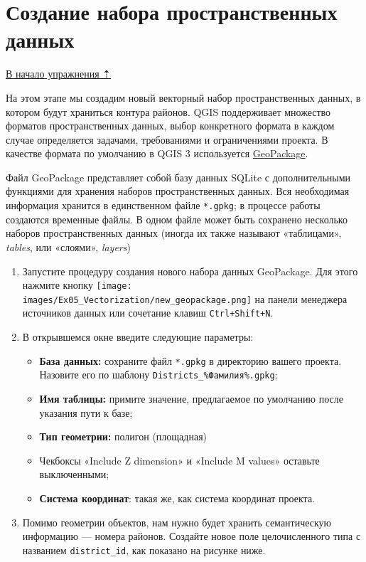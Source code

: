 \documentclass[
  12pt,
]{book}
\providecommand{\tightlist}{%
  \setlength{\itemsep}{0pt}\setlength{\parskip}{0pt}}
\begin{document}
\hypertarget{digitizing-new-geopackage}{%
\section{Создание набора пространственных данных}\label{digitizing-new-geopackage}}

\protect\hyperlink{digitizingf-districts}{В начало упражнения ⇡}

На этом этапе мы создадим новый векторный набор пространственных данных, в котором будут храниться контура районов. QGIS поддерживает множество форматов пространственных данных, выбор конкретного формата в каждом случае определяется задачами, требованиями и ограничениями проекта. В качестве формата по умолчанию в QGIS 3 используется \href{https://www.geopackage.org/}{GeoPackage}.

Файл GeoPackage представляет собой базу данных SQLite с дополнительными функциями для хранения наборов пространственных данных. Вся необходимая информация хранится в единственном файле \texttt{*.gpkg}; в процессе работы создаются временные файлы. В одном файле может быть сохранено несколько наборов пространственных данных (иногда их также называют «таблицами», \emph{tables}, или «слоями», \emph{layers})

\begin{enumerate}
\def\labelenumi{\arabic{enumi}.}
\item
  Запустите процедуру создания нового набора данных GeoPackage. Для этого нажмите кнопку \texttt{[image: images/Ex05\_Vectorization/new\_geopackage.png]} на панели менеджера источников данных или сочетание клавиш \texttt{Ctrl+Shift+N}.
\item
  В открывшемся окне введите следующие параметры:

  \begin{itemize}
  \tightlist
  \item
    \textbf{База данных:} сохраните файл \texttt{*.gpkg} в директорию вашего проекта. Назовите его по шаблону \texttt{Districts\_\%Фамилия\%.gpkg};
  \item
    \textbf{Имя таблицы:} примите значение, предлагаемое по умолчанию после указания пути к базе;
  \item
    \textbf{Тип геометрии:} полигон (площадная)
  \item
    Чекбоксы «Include Z dimension» и «Include M values» оставьте выключенными;
  \item
    \textbf{Система координат}: такая же, как система координат проекта.
  \end{itemize}
\item
  Помимо геометрии объектов, нам нужно будет хранить семантическую информацию --- номера районов. Создайте новое поле целочисленного типа с названием \texttt{district\_id}, как показано на рисунке ниже.
\end{enumerate}
\end{document}
